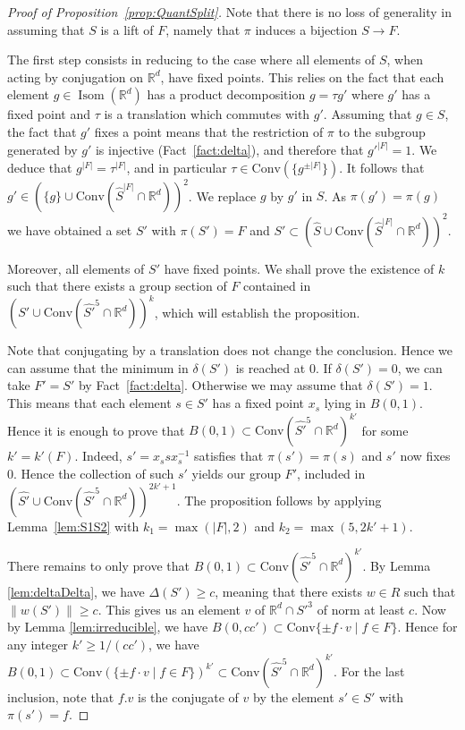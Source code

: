 \documentclass[11pt,leqno]{article}
\theoremstyle{plain}
\theoremstyle{definition}
\theoremstyle{remark}
\numberwithin{equation}{section}
\newcommand{\R}{\mathbb{R}}
\DeclareMathOperator{\Isom}{Isom}
\begin{document}
\begin{proof}[Proof of Proposition~\ref{prop:QuantSplit}]
Note that there is no loss of generality in assuming that $S$ is a lift of $F$, namely that $\pi$ induces a bijection $S\to F$. 

The first step consists in reducing to the case where all elements of $S$, when acting by conjugation on $\R^d$, have fixed points. This relies on the fact that each element $g\in\Isom(\R^d)$ has a product decomposition $g=\tau g'$ where $g'$ has a fixed point and $\tau$ is a translation which commutes with $g'$. Assuming that $g\in S$, the fact that $g'$ fixes a point means that the restriction of $\pi$ to the subgroup generated by $g'$ is injective (Fact~\ref{fact:delta}), and therefore that $g'^{|F|}=1$. We deduce that $g^{|F|}=\tau^{|F|}$, and in particular $\tau  \in \mathrm{Conv}(\{g^{\pm |F|}\})$. It follows that 
$g'\in (\{g\}\cup \mathrm{Conv}(\widehat{S}^{|F|}\cap \R^d))^2$. We replace $g$ by $g'$ in $S$. As $\pi(g')=\pi(g)$ we have obtained a set $S'$ with $\pi(S')=F$ and $S' \subset \left( \widehat{S}\cup\mathrm{Conv}(\widehat{S}^{|F|}\cap\mathbb{R}^d)\right)^2$.


Moreover, all elements of $S'$ have fixed points. We shall prove the existence of $k$ such that there exists a group section of $F$ contained in $(S'\cup\mathrm{Conv}(\widehat{S'}^{5}\cap \R^d))^k$, which will establish the proposition.


 Note that conjugating by a translation does not change the conclusion. 
Hence we can assume that the minimum in $\delta(S')$ is reached at $0$. If $\delta(S')=0$, we can take $F'=S'$ by Fact~\ref{fact:delta}. 
Otherwise we may assume that $\delta(S')=1$. This means that each element  $s\in S'$ has a fixed point $x_s$ lying in $B(0,1)$. Hence it is enough to prove that $B(0,1)\subset \mathrm{Conv}(\widehat{S'}^5\cap \R^d)^{k'}$ for some $k'=k'(F)$. Indeed, $s'=x_s sx_s^{-1}$ satisfies that $\pi(s')=\pi(s)$ and $s'$ now fixes $0$. Hence the collection of such $s'$ yields our group $F'$, included in $\left(\widehat{S'}\cup\mathrm{Conv}(\widehat{S'}^5\cap\mathbb{R}^d)\right)^{2k'+1}$. The proposition follows by applying Lemma~\ref{lem:S1S2} with $k_1=\max(|F|,2)$ and $k_2=\max(5,2k'+1)$.

There remains to only prove that $B(0,1)\subset \mathrm{Conv}(\widehat{S'}^5\cap \R^d)^{k'}$. By Lemma \ref{lem:deltaDelta}, we have $\Delta(S')\geq c$, meaning that there exists $w\in R$ such that $\|w(S')\|\geq c$. This gives us an element $v$ of $\R^d\cap S'^3$ of norm at least $c$.
Now by Lemma \ref{lem:irreducible},  we have $B(0,cc')\subset \mathrm{Conv}\{\pm f\cdot  v\mid f\in F\}$. Hence for any integer $k'\geq 1/(cc')$, we have $B(0,1)\subset \mathrm{Conv}(\{\pm f\cdot  v\mid f\in F\})^{k'} \subset \mathrm{Conv}(\widehat{S'}^5\cap \R^d)^{k'}$.  For the last inclusion, note that $f.v$ is the conjugate of $v$ by the element $s'\in S'$ with $\pi(s')=f$.
\end{proof}
\end{document}
